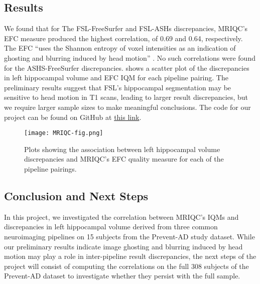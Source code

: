 \documentclass[../main.tex]{subfiles}
\begin{document}
\subsection{Results}

We found that for The FSL-FreeSurfer and FSL-ASHs discrepancies, MRIQC’s EFC measure produced the highest correlation, of 0.69 and 0.64, respectively. The EFC “uses the Shannon entropy of voxel intensities as an indication of ghosting and blurring induced by head motion” \parencite{MRIQCdoc}. No such correlations were found for the ASHS-FreeSurfer discrepancies.  shows a scatter plot of the discrepancies in left hippocampal volume and EFC IQM for each pipeline pairing. The preliminary results suggest that FSL’s hippocampal segmentation may be sensitive to head motion in T1 scans, leading to larger result discrepancies, but we require larger sample sizes to make meaningful conclusions. The code for our project can be found on GitHub at \href{https://github.com/jacobsanz97/Pipeline-Discrepancy-Exploration}{this link}. 

\begin{figure}
	\centering
	\texttt{[image: MRIQC-fig.png]}
	\caption{Plots showing the association between left hippocampal volume discrepancies and MRIQC’s EFC quality measure for each of the pipeline pairings.}
	\label{fig:MRIQC-fig}
\end{figure}

\subsection{Conclusion and Next Steps}

In this project, we investigated the correlation between MRIQC’s IQMs and discrepancies in left hippocampal volume derived from three common neuroimaging pipelines on 15 subjects from the Prevent-AD study dataset. While our preliminary results indicate image ghosting and blurring induced by head motion may play a role in inter-pipeline result discrepancies, the next steps of the project will consist of computing the correlations on the full 308 subjects of the Prevent-AD dataset to investigate whether they persist with the full sample.

\printbibliography
\end{document}
